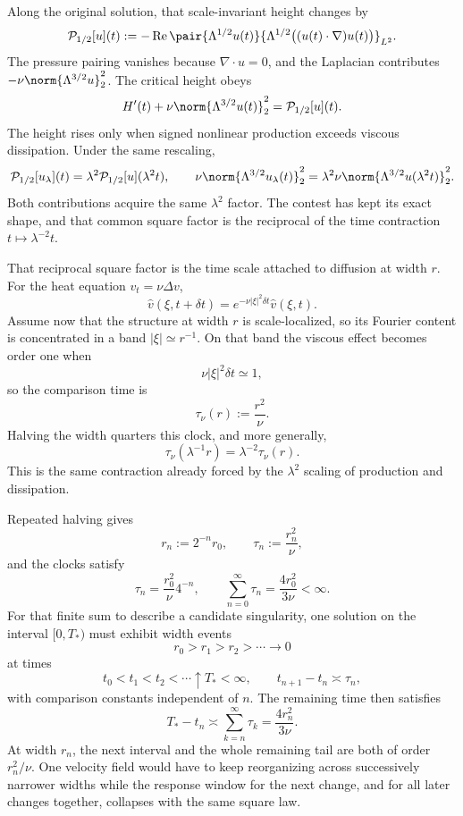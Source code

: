 
Along the original solution, that scale-invariant height changes by
\[
  \mathcal P_{1/2}[u](t)
  :=
  -\operatorname{Re}
  \pair
    {\Lambda^{1/2}u(t)}
    {\Lambda^{1/2}\bigl((u(t)\cdot\nabla)u(t)\bigr)}_{L^2}.
\]
The pressure pairing vanishes because \(\nabla\cdot u=0\), and the Laplacian contributes \(-\nu\norm{\Lambda^{3/2}u}_2^2\). The critical height obeys
\[
  H'(t)
  +
  \nu\norm{\Lambda^{3/2}u(t)}_2^2
  =
  \mathcal P_{1/2}[u](t).
\]
The height rises only when signed nonlinear production exceeds viscous dissipation. Under the same rescaling,
\[
  \mathcal P_{1/2}[u_\lambda](t)
  =
  \lambda^2\mathcal P_{1/2}[u](\lambda^2t),
  \qquad
  \nu\norm{\Lambda^{3/2}u_\lambda(t)}_2^2
  =
  \lambda^2\nu\norm{\Lambda^{3/2}u(\lambda^2t)}_2^2.
\]
Both contributions acquire the same \(\lambda^2\) factor. The contest has kept its exact shape, and that common square factor is the reciprocal of the time contraction \(t\mapsto\lambda^{-2}t\).


That reciprocal square factor is the time scale attached to diffusion at width \(r\). For the heat equation \(v_t=\nu\Delta v\),
\[
  \widehat v(\xi,t+\delta t)
  =
  e^{-\nu|\xi|^2\delta t}\widehat v(\xi,t).
\]
Assume now that the structure at width \(r\) is scale-localized, so its Fourier content is concentrated in a band \(|\xi|\simeq r^{-1}\). On that band the viscous effect becomes order one when
\[
  \nu|\xi|^2\delta t\simeq1,
\]
so the comparison time is
\[
  \tau_\nu(r)
  :=
  \frac{r^2}{\nu}.
\]
Halving the width quarters this clock, and more generally,
\[
  \tau_\nu(\lambda^{-1}r)
  =
  \lambda^{-2}\tau_\nu(r).
\]
This is the same contraction already forced by the \(\lambda^2\) scaling of production and dissipation.


Repeated halving gives
\[
  r_n:=2^{-n}r_0,
  \qquad
  \tau_n:=\frac{r_n^2}{\nu},
\]
and the clocks satisfy
\[
  \tau_n
  =
  \frac{r_0^2}{\nu}4^{-n},
  \qquad
  \sum_{n=0}^{\infty}\tau_n
  =
  \frac{4r_0^2}{3\nu}
  <
  \infty.
\]
For that finite sum to describe a candidate singularity, one \NavierStokes{} solution on the interval \([0,T_*)\) must exhibit width events
\[
  r_0>r_1>r_2>\cdots\longrightarrow0
\]
at times
\[
  t_0<t_1<t_2<\cdots\uparrow T_*<\infty,
  \qquad
  t_{n+1}-t_n\asymp\tau_n,
\]
with comparison constants independent of \(n\). The remaining time then satisfies
\[
  T_*-t_n
  \asymp
  \sum_{k=n}^{\infty}\tau_k
  =
  \frac{4r_n^2}{3\nu}.
\]
At width \(r_n\), the next interval and the whole remaining tail are both of order \(r_n^2/\nu\). One velocity field would have to keep reorganizing across successively narrower widths while the response window for the next change, and for all later changes together, collapses with the same square law.
